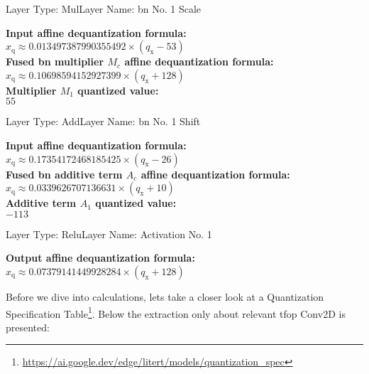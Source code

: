 {\begin{layerbox}{Layer Type: Mul}{Layer Name: \gls{bn} No. 1 Scale}
  \begin{center}
    \textbf{Input affine dequantization formula:} \\[2pt]
    $x_{\text{q}} \approx 0.013497387990355492 \times (q_{\text{x}} - 53)$ \\[6pt]
    \textbf{Fused \gls{bn} multiplier $M_c$ affine dequantization formula:} \\[2pt]
    $x_{\text{q}} \approx 0.10698594152927399 \times (q_{\text{x}} + 128)$ \\[6pt]
    \textbf{Multiplier $M_1$ quantized value:} \\[2pt]
    $55$ \\[6pt]
  \end{center}
\end{layerbox}

\begin{layerbox}{Layer Type: Add}{Layer Name: \gls{bn} No. 1 Shift}
  \begin{center}
    \textbf{Input affine dequantization formula:} \\[2pt]
    $x_{\text{q}} \approx 0.17354172468185425 \times (q_{\text{x}} - 26)$ \\[6pt]
    \textbf{Fused \gls{bn} additive term $A_c$ affine dequantization formula:} \\[2pt]
    $x_{\text{q}} \approx 0.0339626707136631 \times (q_{\text{x}} + 10)$ \\[6pt]
    \textbf{Additive term $A_1$ quantized value:} \\[2pt]
    $-113$ \\[6pt]
  \end{center}
\end{layerbox}

\begin{layerbox}{Layer Type: Relu}{Layer Name: Activation No. 1}
  \begin{center}
    \textbf{Output affine dequantization formula:} \\[2pt]
    $x_{\text{q}} \approx 0.07379141449928284 \times (q_{\text{x}} + 128)$ \\[6pt]
  \end{center}
\end{layerbox}

Before we dive into calculations, lets take a closer look at a Quantization Specification Table\footnote{\url{https://ai.google.dev/edge/litert/models/quantization_spec}}.
Below the extraction only about relevant \gls{tfop} Conv2D is presented:

}

